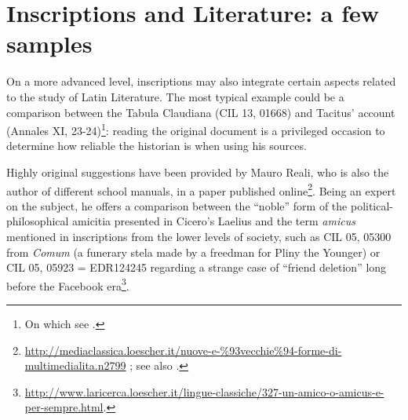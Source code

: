\documentclass[amsthm,ebook]{saparticle}
\begin{document}
\section{Inscriptions and Literature: a few samples}
\noindent On a more advanced level, inscriptions may also integrate certain aspects related to the study of Latin Literature. The
most typical example could be a comparison between the Tabula Claudiana (CIL 13, 01668) and Tacitus’ account (Annales
XI, 23-24)\footnote{ On which see \citet{Jahn1993}.}: reading the original document is a privileged occasion to determine how
reliable the historian is when using his sources.

Highly original suggestions have been provided by Mauro Reali, who is also the author of different school manuals, in a
paper published online\footnote{\url{http://mediaclassica.loescher.it/nuove-e-\%93vecchie\%94-forme-di-multimedialita.n2799}
; see also \citet{Reali2015}.}. Being an expert on the subject, he offers a comparison between the ``noble'' form of
the political-philosophical amicitia presented in Cicero’s Laelius and the term \emph{amicus} mentioned in inscriptions
from the lower levels of society, such as CIL 05, 05300 from \emph{Comum} (a funerary stela made by a freedman for
Pliny the Younger) or CIL 05, 05923 = EDR124245 regarding a strange case of ``friend deletion'' long before the Facebook
era\footnote{ \url{http://www.laricerca.loescher.it/lingue-classiche/327-un-amico-o-amicus-e-per-sempre.html}.}.
\end{document}
